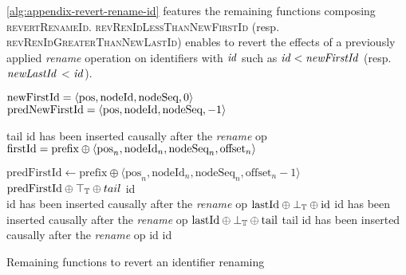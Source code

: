 \label{app:revert-rename-id}

\autoref{alg:appendix-revert-rename-id} features the remaining functions composing \textsc{revertRenameId}.
\textsc{revRenIdLessThanNewFirstId} (resp. \textsc{revRenIdGreaterThanNewLastId}) enables to revert the effects of a previously applied \emph{rename} operation on identifiers with $\mathit{id}$ such as $\mathit{id} < \mathit{newFirstId}$ (resp. $\mathit{newLastId}$ < $\mathit{id}$).

\begin{algorithm}[!ht]
  \footnotesize
  \begin{algorithmic}[1]
        \Statex \Comment $\text{newFirstId} = \langle \text{pos},\text{nodeId},\text{nodeSeq},0 \rangle$
        \Statex \Comment $\text{predNewFirstId} = \langle \text{pos},\text{nodeId},\text{nodeSeq},-1 \rangle$

                  \State \Return tail
              \Else
                  \Statex \Comment id has been inserted causally after the \emph{rename} op
                  \Statex \Comment $\text{firstId} = \text{prefix} \oplus \langle \text{pos}_{n},\text{nodeId}_{n},\text{nodeSeq}_{n},\text{offset}_{n} \rangle$

                  \State $\text{predFirstId} \gets \text{prefix} \oplus \langle \text{pos}_n,\text{nodeId}_n,\text{nodeSeq}_n,\text{offset}_n - 1 \rangle$
                  \State \Return $\text{predFirstId} \oplus \top_\mathbb{T} \oplus tail$
              \EndIf
          \Else
              \State \Return id
          \EndIf
      \EndFunction
      \\
              \Statex \Comment id has been inserted causally after the \emph{rename} op
              \State \Return $\text{lastId} \oplus \bot_\mathbb{T} \oplus \text{id}$
                  \Statex \Comment id has been inserted causally after the \emph{rename} op
                  \State \Return $\text{lastId} \oplus \bot_\mathbb{T} \oplus \text{tail}$
                  \State \Return tail
              \Else
                  \Statex \Comment id has been inserted causally after the \emph{rename} op
                  \State \Return id
              \EndIf
          \Else
              \State \Return id
          \EndIf
      \EndFunction
  \end{algorithmic}
  \caption{Remaining functions to revert an identifier renaming}
  \label{alg:appendix-revert-rename-id}
\end{algorithm}

